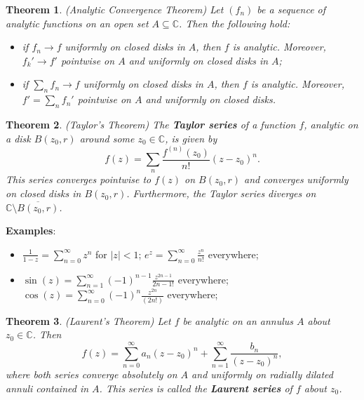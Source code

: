 \documentclass[11pt]{amsart}
\newtheorem*{theorem*}{Theorem}
\theoremstyle{definition}
\renewcommand\:{\colon}
\renewcommand\bar[1]{\overline{#1}}
\newcommand{\C}{\mathds{C}}
\begin{document}
\begin{theorem*}
	\textnormal{(Analytic Convergence Theorem)} Let $(f_n)$ be a sequence of analytic functions on an open set $A \subseteq \C$. Then the following hold:
	\begin{itemize}[leftmargin=22.5pt]\setlength\itemsep{0em}
		\item[\textnormal{(i)}] if $f_n \to f$ uniformly on closed disks in $A$, then $f$ is analytic. Moreover, $f_k' \to f'$ pointwise on $A$ and uniformly on closed disks in $A$;
		\item[\textnormal{(ii)}] if $\sum_n f_n \to f$ uniformly on closed disks in $A$, then $f$ is analytic. Moreover, $f' = \sum_n f_n'$ pointwise on $A$ and uniformly on closed disks.
	\end{itemize}
\end{theorem*}

\begin{theorem*}
	\textnormal{(Taylor's Theorem)} The \textbf{Taylor series} of a function $f$, analytic on a disk $B(z_0, r)$ around some $z_0 \in \C$, is given by
		\[ f(z) = \sum_n \frac{f^{(n)}(z_0)}{n!} (z - z_0)^n. \]
	This series converges pointwise to $f(z)$ on $B(z_0, r)$ and converges uniformly on closed disks in $B(z_0, r)$. Furthermore, the Taylor series diverges on $\C \setminus \bar{B(z_0, r)}$.
\end{theorem*}

\noindent \textbf{Examples}:
\begin{itemize}[leftmargin=12.5pt]\setlength\itemsep{0em}
	\item[] $\displaystyle \frac1{1 - z} = \sum_{n=0}^\infty z^n$ for $|z| < 1$; \hskip105pt $\displaystyle e^z = \sum_{n=0}^\infty \frac{z^n}{n!}$ everywhere;
	\item[] $\displaystyle \sin(z) = \sum_{n=1}^\infty (-1)^{n-1} \frac{z^{2n-1}}{{2n-1}!}$ everywhere; \hskip40pt $\displaystyle \cos(z) = \sum_{n=0}^\infty (-1)^n \frac{z^{2n}}{(2n!)}$ everywhere;
\end{itemize}
\clearpage

\begin{theorem*}
	\textnormal{(Laurent's Theorem)} Let $f$ be analytic on an annulus $A$ about $z_0 \in \C$. Then
		\[ f(z) = \sum_{n=0}^\infty a_n(z - z_0)^n + \sum_{n=1}^\infty \frac{b_n}{(z - z_0)^n}, \]
	where both series converge absolutely on $A$ and uniformly on radially dilated annuli contained in $A$. This series is called the \textbf{Laurent series} of $f$ about $z_0$.
\end{theorem*}
\end{document}
